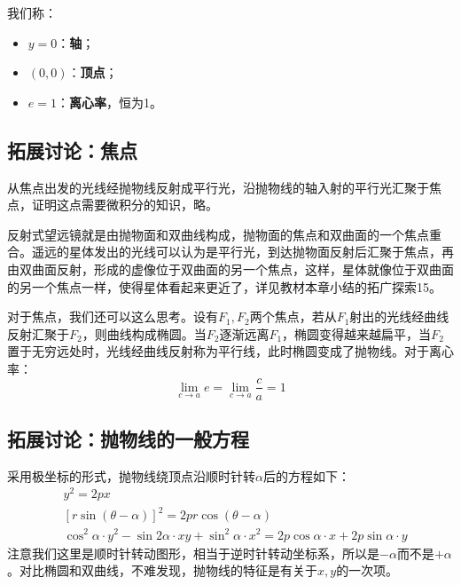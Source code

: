 我们称：
\begin{itemize}
    \item $y=0$：{\bf 轴}；
    \item $\left( 0,0 \right) $：{\bf 顶点}；
    \item $e=1$：{\bf 离心率}，恒为1。
\end{itemize}

\subsection{拓展讨论：焦点}

从焦点出发的光线经抛物线反射成平行光，沿抛物线的轴入射的平行光汇聚于焦点，证明这点需要微积分的知识，略。

\begin{figure}[ht]
\centering
{}
\end{figure}

反射式望远镜就是由抛物面和双曲线构成，抛物面的焦点和双曲面的一个焦点重合。遥远的星体发出的光线可以认为是平行光，到达抛物面反射后汇聚于焦点，再由双曲面反射，形成的虚像位于双曲面的另一个焦点，这样，星体就像位于双曲面的另一个焦点一样，使得星体看起来更近了，详见教材本章小结的拓广探索15。

对于焦点，我们还可以这么思考。设有$F_1,F_2$两个焦点，若从$F_1$射出的光线经曲线反射汇聚于$F_2$，则曲线构成椭圆。当$F_2$逐渐远离$F_1$，椭圆变得越来越扁平，当$F_2$置于无穷远处时，光线经曲线反射称为平行线，此时椭圆变成了抛物线。对于离心率：
\[
\lim_{c\rightarrow a} e=\lim_{c\rightarrow a} \frac{c}{a}=1
\]

\subsection{拓展讨论：抛物线的一般方程}

采用极坐标的形式，抛物线绕顶点沿顺时针转$\alpha $后的方程如下：
\begin{align*}
&y^2=2px \\
&\left[ r\sin \left( \theta -\alpha \right) \right] ^2=2pr\cos \left( \theta -\alpha \right) \\
&\cos ^2\alpha \cdot y^2-\sin 2\alpha \cdot xy+\sin ^2\alpha \cdot x^2=2p\cos \alpha \cdot x+2p\sin \alpha \cdot y
\end{align*}
注意我们这里是顺时针转动图形，相当于逆时针转动坐标系，所以是$-\alpha $而不是$+\alpha $。对比椭圆和双曲线，不难发现，抛物线的特征是有关于$x,y$的一次项。




